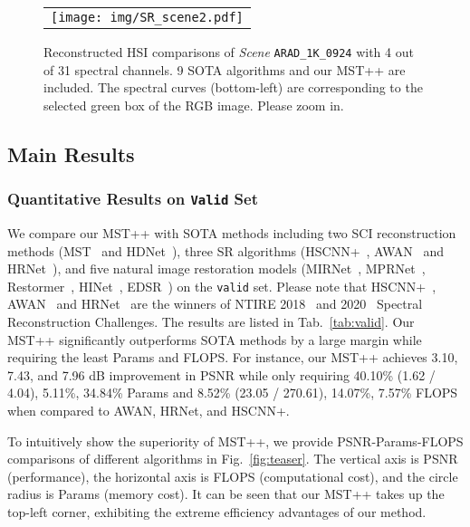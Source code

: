 \documentclass[10pt,twocolumn,letterpaper]{article}
\begin{document}
\begin{figure*}[t]
	\begin{center}
		\begin{tabular}[t]{c} \hspace{-2.7mm} \texttt{[image: img/SR\_scene2.pdf]}
		\end{tabular}
	\end{center}
	\vspace{-5mm}
	\caption{\small Reconstructed HSI comparisons of \emph{Scene} \texttt{ARAD\_1K\_0924} with 4 out of 31 spectral channels. 9 SOTA algorithms and our MST++ are included. The spectral curves (bottom-left) are corresponding to the selected green box of the RGB image. Please zoom in.}
	\label{fig:real}
\end{figure*}

\subsection{Main Results}
\subsubsection{Quantitative Results on \texttt{Valid} Set}
We compare our MST++ with SOTA methods including two SCI reconstruction methods (MST~\cite{mst} and HDNet~\cite{hdnet}), three SR algorithms (HSCNN+~\cite{shi2018hscnn}, AWAN~\cite{awan} and HRNet~\cite{orange_cat}), and five natural image restoration models (MIRNet~\cite{mirnet}, MPRNet~\cite{mprnet}, Restormer~\cite{restormer}, HINet~\cite{hinet}, EDSR~\cite{edsr}) on the \texttt{valid} set. Please note that HSCNN+~\cite{shi2018hscnn}, AWAN~\cite{awan} and HRNet~\cite{orange_cat} are the winners of NTIRE 2018~\cite{arad2018ntire} and 2020~\cite{arad2020ntire} Spectral Reconstruction Challenges. The results are listed in Tab.~\ref{tab:valid}. Our MST++ significantly outperforms SOTA methods by a large margin while requiring the least Params and FLOPS. For instance, our MST++ achieves 3.10, 7.43, and 7.96 dB improvement in PSNR while only requiring 40.10\% (1.62 / 4.04), 5.11\%, 34.84\% Params and 8.52\% (23.05 / 270.61), 14.07\%, 7.57\% FLOPS when compared to AWAN, HRNet, and HSCNN+.

To intuitively show the superiority of MST++, we provide PSNR-Params-FLOPS comparisons of different algorithms in Fig.~\ref{fig:teaser}. The vertical axis is PSNR (performance), the horizontal axis is FLOPS (computational cost), and the circle radius is Params (memory cost). It can be seen that our MST++ takes up the top-left corner, exhibiting the extreme efficiency advantages of our method.
\end{document}
